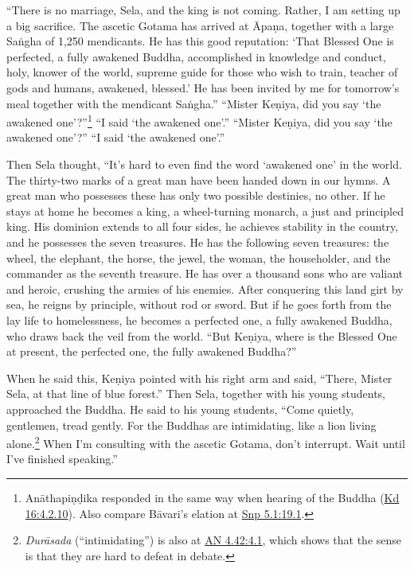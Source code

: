 \documentclass[12pt,openany]{book}%
\begin{document}
“There is no marriage, Sela, and the king is not coming. Rather, I am setting up a big sacrifice. The ascetic Gotama has arrived at \textsanskrit{Āpaṇa}, together with a large \textsanskrit{Saṅgha} of 1,250 mendicants. He has this good reputation: ‘That Blessed One is perfected, a fully awakened Buddha, accomplished in knowledge and conduct, holy, knower of the world, supreme guide for those who wish to train, teacher of gods and humans, awakened, blessed.’ He has been invited by me for tomorrow’s meal together with the mendicant \textsanskrit{Saṅgha}.” “Mister \textsanskrit{Keṇiya}, did you say ‘the awakened one’?”\footnote{\textsanskrit{Anāthapiṇḍika} responded in the same way when hearing of the Buddha (\href{https://suttacentral.net/pli-tv-kd16/en/sujato\#4.2.10}{Kd 16:4.2.10}). Also compare \textsanskrit{Bāvari}’s elation at \href{https://suttacentral.net/snp5.1/en/sujato\#19.1}{Snp 5.1:19.1}. } “I said ‘the awakened one’.” “Mister \textsanskrit{Keṇiya}, did you say ‘the awakened one’?” “I said ‘the awakened one’.” 

Then Sela thought, “It’s hard to even find the word ‘awakened one’ in the world. The thirty-two marks of a great man have been handed down in our hymns. A great man who possesses these has only two possible destinies, no other. If he stays at home he becomes a king, a wheel-turning monarch, a just and principled king. His dominion extends to all four sides, he achieves stability in the country, and he possesses the seven treasures. He has the following seven treasures: the wheel, the elephant, the horse, the jewel, the woman, the householder, and the commander as the seventh treasure. He has over a thousand sons who are valiant and heroic, crushing the armies of his enemies. After conquering this land girt by sea, he reigns by principle, without rod or sword. But if he goes forth from the lay life to homelessness, he becomes a perfected one, a fully awakened Buddha, who draws back the veil from the world. “But \textsanskrit{Keṇiya}, where is the Blessed One at present, the perfected one, the fully awakened Buddha?” 

When he said this, \textsanskrit{Keṇiya} pointed with his right arm and said, “There, Mister Sela, at that line of blue forest.” Then Sela, together with his young students, approached the Buddha. He said to his young students, “Come quietly, gentlemen, tread gently. For the Buddhas are intimidating, like a lion living alone.\footnote{\textit{\textsanskrit{Durāsada}} (“intimidating”) is also at \href{https://suttacentral.net/an4.42/en/sujato\#4.1}{AN 4.42:4.1}, which shows that the sense is that they are hard to defeat in debate. } When I’m consulting with the ascetic Gotama, don’t interrupt. Wait until I’ve finished speaking.” 
\end{document}
